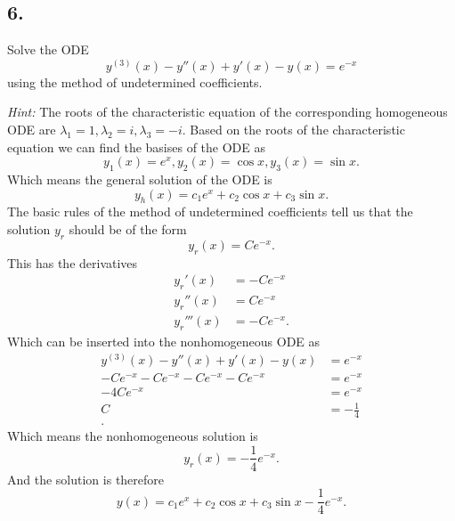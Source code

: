 \subsection*{6.} Solve the ODE
\[ 
y^{(3)}(x) - y''(x) + y'(x) - y(x) = e^{-x}
\]
using the method of undetermined coefficients.

\textit{Hint:} The roots of the characteristic equation of the corresponding homogeneous ODE are $\lambda_1 = 1, \lambda_2 = i, \lambda_3 = -i$.
\bigbreak
Based on the roots of the characteristic equation we can find the basises of the ODE as
\[ 
y_1 (x) = e^{x}, y_2(x) = \cos x, y_3(x) = \sin x
.\]
Which means the general solution of the ODE is
\[ 
y_h(x) = c_1 e^{x} + c_2 \cos x + c_3 \sin x
.\]
The basic rules of the method of undetermined coefficients tell us that the solution $y_r$ should be of the form
\[ 
y_r(x) = C e^{-x}
.\]
This has the derivatives
\begin{align*}
  y_r'(x) &= - C e^{-x} \\
  y_r''(x) &= C e^{-x} \\
  y_r'''(x) &= - C e^{-x}
.\end{align*}
Which can be inserted into the nonhomogeneous ODE as
\begin{align*}
  y^{(3)}(x) - y''(x) + y'(x) - y(x) &= e^{-x} \\
  - C e^{-x} - C e^{-x} - C e^{-x} - C e^{-x} &= e^{-x} \\
  - 4 C e^{-x} &= e^{-x} \\
  C &= -\frac{1}{4} \\
.\end{align*}
Which means the nonhomogeneous solution is
\[ 
y_r(x) = - \frac{1}{4} e^{-x}
.\]
And the solution is therefore
\[ 
y(x) = c_1 e^{x} + c_2 \cos x + c_3 \sin x - \frac{1}{4} e^{-x}
.\]





